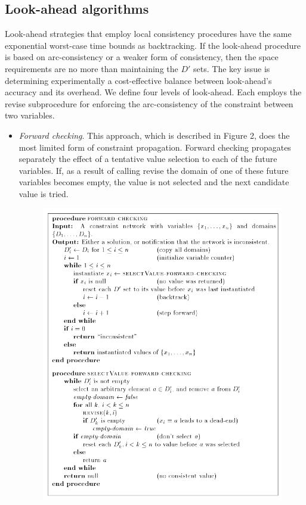 \documentclass{article}
\begin{document}
\subsection{Look-ahead algorithms}
Look-ahead strategies that employ local consistency procedures have the same
exponential worst-case time bounds as backtracking. If the look-ahead procedure is based on arc-consistency or a weaker form of consistency, then the space
requirements are no more than maintaining the $D'$ sets. The key issue is determining experimentally a cost-effective balance between look-ahead's accuracy
and its overhead. We define four levels of look-ahead. Each employs the revise subprocedure for enforcing the arc-consistency of the constraint
between two variables.
\begin{itemize}
  \item \textit{Forward checking}. This approach, which is described in Figure 2,
  does the most limited form of constraint propagation. Forward checking
  propagates separately the effect of a tentative value selection to each of the future variables. If, as a result of calling revise the domain of one
  of these future variables becomes empty, the value is not selected and the
  next candidate value is tried.
  \begin{figure}[H]
    \centering
    \includegraphics[scale=0.5]{Figs/forward-checking-algorithm.png}

\end{figure}
\end{itemize}
\end{document}
